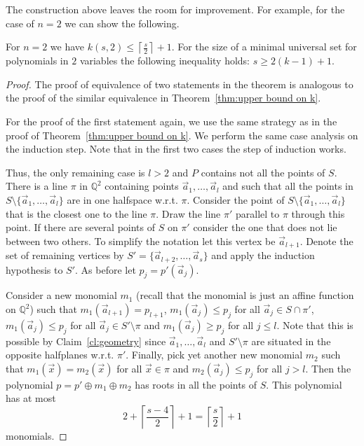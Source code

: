 \documentclass[11pt]{article}
\newcommand{\ta}{\oplus}
\newcommand{\bb}[1]{\mathbb{#1}}
\begin{document}
The construction above leaves the room for improvement. 
For example, for the case of $n=2$ we can show the following.

\begin{theorem} \label{thm:univ_dim_2_upper}
For $n=2$ we have $k(s,2) \leq \left\lceil \frac{s}{2}\right\rceil + 1$.  For the size of a minimal universal set for polynomials in $2$ variables the following inequality holds: $s \geq 2(k-1) +1$.
\end{theorem}

\begin{proof}
The proof of equivalence of two statements in the theorem is analogous to the proof of the similar equivalence in Theorem~\ref{thm:upper bound on k}.

For the proof of the first statement again, we use the same strategy as in the proof of Theorem~\ref{thm:upper bound on k}. We perform the same case analysis on the induction step.
Note that in the first two cases the step of induction works.



Thus, the only remaining case is $l > 2$ and $P$ contains not all the points of $S$. There is a line $\pi$ in $\bb{Q}^2$ containing points $\vec{a}_1,\ldots, \vec{a}_l$ and such that all the points in $S \setminus \{\vec{a}_1,\ldots,\vec{a}_l\}$ are in one halfspace w.r.t. $\pi$. Consider the point of $S \setminus \{\vec{a}_1,\ldots,\vec{a}_l\}$ that is the closest one to the line $\pi$. Draw the line $\pi'$ parallel to $\pi$ through this point. If there are several points of $S$ on $\pi'$ consider the one that does not lie between two others. To simplify the notation let this vertex be $\vec{a}_{l+1}$. Denote the set of remaining vertices by $S'=\{\vec{a}_{l+2},\ldots, \vec{a}_s\}$ and 
apply the induction hypothesis to $S'$. 
As before let $p_j = p'(\vec{a}_j)$.

Consider a new monomial $m_1$ (recall that the monomial is just an affine function on $\bb{Q}^2$) such that $m_1(\vec{a}_{l+1}) = p_{l+1}$, $m_1(\vec{a}_{j}) \leq p_{j}$ for all $\vec{a}_j \in S \cap \pi'$, $m_1(\vec{a}_{j}) \leq p_{j}$ for all $\vec{a}_j \in S'\setminus\pi$ and  $m_1(\vec{a}_{j}) \geq p_{j}$ for all $j\leq l$. Note that this is possible by Claim~\ref{cl:geometry} since $\vec{a}_1, \ldots, \vec{a}_l$ and $S'\setminus\pi$ are situated in the opposite halfplanes w.r.t. $\pi'$. Finally, pick yet another new monomial $m_2$ such that $m_1(\vec{x})=m_{2}(\vec{x})$ for all $\vec{x} \in \pi$ and $m_{2}(\vec{a}_j) \leq p_j$ for all $j>l$. 
Then the polynomial $p = p' \ta m_1 \ta m_2$ has roots in all the points of $S$. This polynomial has at most 
$$
2 + \left\lceil \frac{s-4}{2}\right\rceil + 1 = \left\lceil \frac{s}{2}\right\rceil + 1
$$
monomials.
\end{proof}
\end{document}
